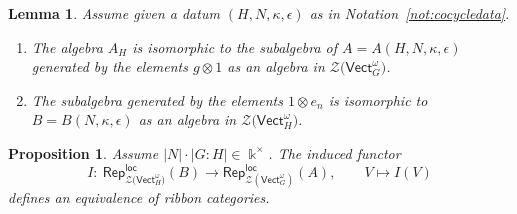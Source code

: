 \documentclass[pdftex]{sigma}
\numberwithin{equation}{section}
\newtheorem{Lemma}[Theorem]{Lemma}
\newtheorem{Proposition}[Theorem]{Proposition}
 { \theoremstyle{definition}
\newtheorem{Definition}[Theorem]{Definition}
\newtheorem{Note}[Theorem]{Note}
\newtheorem{Notation}[Theorem]{Notation}
\newtheorem{Example}[Theorem]{Example}
\newtheorem{Remark}[Theorem]{Remark} }
\newcommand{\locmod}{\mathsf{Rep}^{\mathsf{loc}}}
\newcommand{\Vect}{\mathsf{Vect}}
\newcommand{\cZ}{\mathcal{Z}}
\begin{document}
\begin{Lemma}\label{lem:AH-subalg} Assume given a datum $(H,N,\kappa,\epsilon)$ as in Notation~{\rm \ref{not:cocycledata}}.
\begin{enumerate}\itemsep=0pt
 \item[$(a)$]
The algebra $A_H$ is isomorphic to the subalgebra of $A=A(H,N,\kappa,\epsilon)$ generated by the elements $g\otimes 1$ as an algebra in $\cZ\big(\Vect_G^\omega\big)$.
\item[$(b)$]
The subalgebra generated by the elements $1\otimes e_n$ is isomorphic to $B=B(N,\kappa,\epsilon)$ as an algebra in $\cZ\big(\Vect_H^\omega\big)$.
\end{enumerate}
\end{Lemma}

\begin{Proposition}\label{prop:LocmodA}
Assume $|N|\cdot |G:H|\in \Bbbk^\times$. The induced functor
\[I\colon\ \locmod_{\cZ\big(\Vect_H^\omega\big)}(B)\to \locmod_{\cZ(\Vect_G^\omega)}(A), \qquad V\mapsto I(V)\]
defines an equivalence of ribbon categories.
\end{Proposition}
\end{document}
